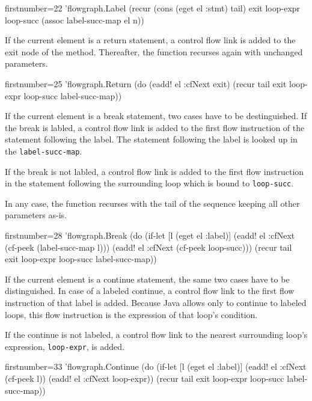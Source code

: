 \documentclass[11pt]{article}
\begin{document}
\begin{clojurecode*}{firstnumber=22}
        'flowgraph.Label
                   (recur (cons (eget el :stmt) tail) exit loop-expr loop-succ
                          (assoc label-succ-map el n))
\end{clojurecode*}

If the current element is a return statement, a control flow link is added to
the exit node of the method.  Thereafter, the function recurses again with
unchanged parameters.

\begin{clojurecode*}{firstnumber=25}
        'flowgraph.Return
                   (do (eadd! el :cfNext exit)
                       (recur tail exit loop-expr loop-succ label-succ-map))
\end{clojurecode*}

If the current element is a break statement, two cases have to be
destinguished.  If the break is labled, a control flow link is added to the
first flow instruction of the statement following the label.  The statement
following the label is looked up in the \verb|label-succ-map|.

If the break is not labled, a control flow link is added to the first flow
instruction in the statement following the surrounding loop which is bound to
\verb|loop-succ|.

In any case, the function recurses with the tail of the sequence keeping all
other parameters as-is.

\begin{clojurecode*}{firstnumber=28}
        'flowgraph.Break
                   (do (if-let [l (eget el :label)]
                         (eadd! el :cfNext (cf-peek (label-succ-map l)))
                         (eadd! el :cfNext (cf-peek loop-succ)))
                       (recur tail exit loop-expr loop-succ label-succ-map))
\end{clojurecode*}

If the current element is a continue statement, the same two cases have to be
distinguished.  In case of a labeled continue, a control flow link to the first
flow instruction of that label is added.  Because Java allows only to continue
to labeled loops, this flow instruction is the expression of that loop's
condition.

If the continue is not labeled, a control flow link to the nearest surrounding
loop's expression, \verb|loop-expr|, is added.

\begin{clojurecode*}{firstnumber=33}
        'flowgraph.Continue
                   (do (if-let [l (eget el :label)]
                         (eadd! el :cfNext (cf-peek l))
                         (eadd! el :cfNext loop-expr))
                       (recur tail exit loop-expr loop-succ label-succ-map))
\end{clojurecode*}
\end{document}
